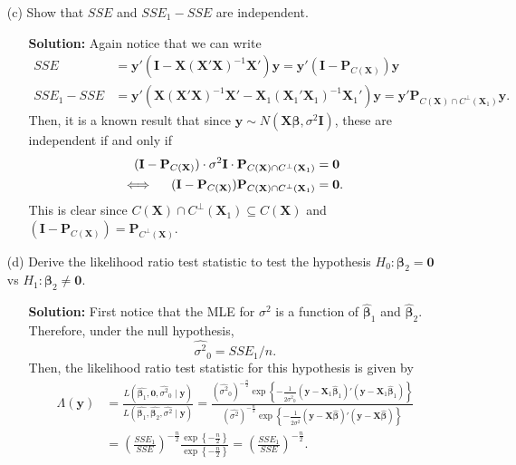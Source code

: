 \documentclass[11pt]{article}
\begin{document}
\begin{itemize}
\begin{itemize}
\newpage

\item[(c)] Show that $SSE$ and $SSE_1 - SSE$ are independent.
\begin{itemize}
\item[] \textbf{Solution:}  Again notice that we can write
\begin{align*}
SSE &= \mathbf{y}'(\mathbf{I}-\mathbf{X}(\mathbf{X}'\mathbf{X})^{-1}\mathbf{X}')\mathbf{y} = \mathbf{y}'(\mathbf{I} - \mathbf{P}_{C(\mathbf{X})})\mathbf{y}\\
SSE_1 - SSE &= \mathbf{y}'(\mathbf{X}(\mathbf{X}'\mathbf{X})^{-1}\mathbf{X}' - \mathbf{X}_1(\mathbf{X}_1'\mathbf{X}_1)^{-1}\mathbf{X}_1')\mathbf{y} = \mathbf{y}'\mathbf{P}_{C(\mathbf{X})\cap C^\perp(\mathbf{X}_1)}\mathbf{y}.
\end{align*}
Then, it is a known result that since $\mathbf{y} \sim N(\mathbf{X}\bm\beta,\sigma^2\mathbf{I})$, these are independent if and only if
\begin{align*}
(\mathbf{I} - \mathbf{P}_{C(\mathbf{X})})\cdot\sigma^2\mathbf{I}\cdot\mathbf{P}_{C(\mathbf{X})\cap C^\perp(\mathbf{X}_1)} &= \mathbf{0} \\
\Longleftrightarrow\hspace{5mm} (\mathbf{I} - \mathbf{P}_{C(\mathbf{X})})\mathbf{P}_{C(\mathbf{X})\cap C^\perp(\mathbf{X}_1)} &= \mathbf{0}.
\end{align*}
This is clear since $C(\mathbf{X})\cap C^\perp(\mathbf{X}_1) \subseteq C(\mathbf{X})$ and $(\mathbf{I} - \mathbf{P}_{C(\mathbf{X})}) = \mathbf{P}_{C^\perp(\mathbf{X})}$.
\end{itemize}

\item[(d)] Derive the likelihood ratio test statistic to test the hypothesis $H_0\colon \bm\beta_2 = \mathbf{0}$ vs $H_1\colon \bm\beta_2 \not= \mathbf{0}$.
\begin{itemize}
\item[] \textbf{Solution:}  First notice that the MLE for $\sigma^2$ is a function of $\widehat{\bm\beta}_1$ and $\widehat{\bm\beta}_2$.  Therefore, under the null hypothesis,
\[
\widehat{\sigma^2}_0 = SSE_1 / n.
\]
Then, the likelihood ratio test statistic for this hypothesis is given by
\begin{align*}
\Lambda(\mathbf{y}) &= \frac{L\left(\widehat{\bm\beta_1},\mathbf{0},\widehat{\sigma^2}_0\mid\mathbf{y}\right)}{L\left(\widehat{\bm\beta_1},\widehat{\bm\beta_2},\widehat{\sigma^2}\mid\mathbf{y}\right)} = \frac{\left(\widehat{\sigma^2}_0\right)^{-\frac{n}{2}} \exp\left\{-\frac{1}{2\widehat{\sigma^2}_0}(\mathbf{y} - \mathbf{X}_1\widehat{\bm\beta}_1)'(\mathbf{y} - \mathbf{X}_1\widehat{\bm\beta}_1)\right\}}{\left(\widehat{\sigma^2}\right)^{-\frac{n}{2}} \exp\left\{-\frac{1}{2\widehat{\sigma^2}}(\mathbf{y} - \mathbf{X}\widehat{\bm\beta})'(\mathbf{y} - \mathbf{X}\widehat{\bm\beta})\right\}} \\
&= \left(\frac{SSE_1}{SSE}\right)^{-\frac{n}{2}} \frac{\exp\left\{-\frac{n}{2}\right\}}{\exp\left\{-\frac{n}{2}\right\}} = \left(\frac{SSE_1}{SSE}\right)^{-\frac{n}{2}}.
\end{align*}
\end{itemize}


\end{itemize}
\end{itemize}
\end{document}
